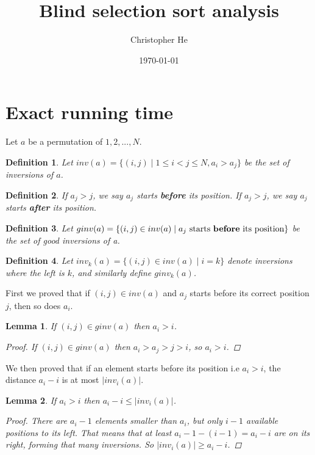 \documentclass{article}
\title{Blind selection sort analysis}
\author{Christopher He}
\date{\today}
\newtheorem{lemma}{Lemma}
\newtheorem{definition}{Definition}
\begin{document}
\maketitle
\section{Exact running time}

Let $a$ be a permutation of $1,2, ..., N$.
\begin{definition}
    Let $inv(a) = \{(i, j) \mid 1 \leq i < j \leq N, a_i > a_j \}$ be the set of inversions of $a$.
\end{definition}

\begin{definition}
    If $a_j > j$, we say $a_j$ starts \textbf{before} its position.
    If $a_j > j$, we say $a_j$ starts \textbf{after} its position.
\end{definition}

\begin{definition}
    Let $ginv(a) = \{(i, j) \in inv(a) \mid \text{$a_j$ starts \textbf{before} its position} \}$
    be the set of good inversions of a.
\end{definition}

\begin{definition}
    Let $inv_k(a) = \{(i, j) \in inv(a) \mid i = k\}$ denote inversions where the left is $k$,
    and similarly define $ginv_k(a)$.
\end{definition}

First we proved that if $(i, j) \in inv(a)$ and $a_j$ starts before its correct position $j$, then
so does $a_i$.

\begin{lemma}
    If $(i, j) \in ginv(a)$ then $a_i > i$.
    \begin{proof}
        If $(i, j) \in ginv(a)$ then $a_i > a_j > j > i$, so $a_i > i$.
    \end{proof}
\end{lemma}

We then proved that if an element starts before its position i.e $a_i > i$, the distance $a_i - i$ is 
at most $\vert inv_i(a) \vert$.

\begin{lemma} If $a_i > i$ then $a_i - i \leq \vert inv_i(a) \vert$.
    \begin{proof} There are $a_i - 1$ elements smaller than $a_i$, but only $i - 1$ available positions to its left. That means that at least $a_i - 1 - (i - 1) = a_i - i $ are on its right, forming that many inversions. So $ \vert inv_i(a) \vert \geq a_i - i$.
    \end{proof}
\end{lemma}
\end{document}
